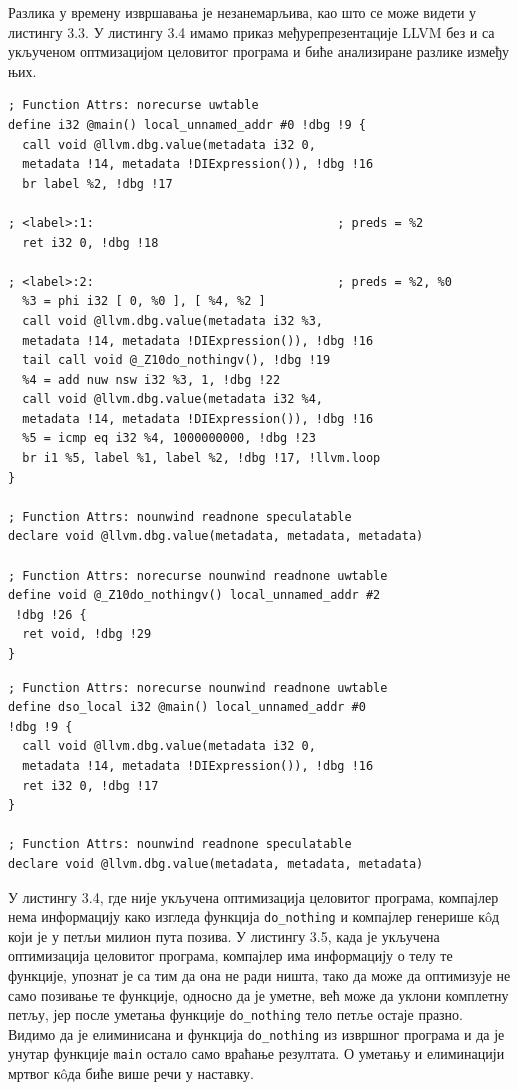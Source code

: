 \documentclass[12pt,oneside]{memoir}
\begin{document}
Разлика у времену извршавања је незанемарљива, као што се може видети у листингу 3.3.
У листингу 3.4 имамо приказ међурепрезентације LLVM  без и са укљученом оптмизацијом целовитог програма
и биће анализиране разлике између њих.
\begin{lstlisting}[frame=single, caption={Međureprezentacija bez optimizacije celovitog programa}, captionpos=b]
; Function Attrs: norecurse uwtable
define i32 @main() local_unnamed_addr #0 !dbg !9 {
  call void @llvm.dbg.value(metadata i32 0, 
  metadata !14, metadata !DIExpression()), !dbg !16
  br label %2, !dbg !17

; <label>:1:                                  ; preds = %2
  ret i32 0, !dbg !18

; <label>:2:                                  ; preds = %2, %0
  %3 = phi i32 [ 0, %0 ], [ %4, %2 ]
  call void @llvm.dbg.value(metadata i32 %3, 
  metadata !14, metadata !DIExpression()), !dbg !16
  tail call void @_Z10do_nothingv(), !dbg !19
  %4 = add nuw nsw i32 %3, 1, !dbg !22
  call void @llvm.dbg.value(metadata i32 %4,
  metadata !14, metadata !DIExpression()), !dbg !16
  %5 = icmp eq i32 %4, 1000000000, !dbg !23
  br i1 %5, label %1, label %2, !dbg !17, !llvm.loop
}

; Function Attrs: nounwind readnone speculatable
declare void @llvm.dbg.value(metadata, metadata, metadata)

; Function Attrs: norecurse nounwind readnone uwtable
define void @_Z10do_nothingv() local_unnamed_addr #2 
 !dbg !26 {
  ret void, !dbg !29
}
\end{lstlisting}


\begin{lstlisting}[frame=single, caption={Međureprezentacija sa optimizacijom celovitog programa}, captionpos=b]
; Function Attrs: norecurse nounwind readnone uwtable
define dso_local i32 @main() local_unnamed_addr #0 
!dbg !9 {
  call void @llvm.dbg.value(metadata i32 0, 
  metadata !14, metadata !DIExpression()), !dbg !16
  ret i32 0, !dbg !17
}

; Function Attrs: nounwind readnone speculatable
declare void @llvm.dbg.value(metadata, metadata, metadata)

\end{lstlisting}

У листингу 3.4, где није укључена оптимизација целовитог програма, компајлер нема информацију  како
изгледа функција \texttt{do{\_}nothing} и компајлер генерише к\^{o}д који је у петљи милион пута позива.
У листингу 3.5, када је укључена оптимизација целовитог програма, компајлер има информацију о телу те функције,
упознат је са тим да она не ради ништа, тако да може да оптимизује не само позивање те функције,
односно да је уметне, већ може да уклони комплетну петљу, јер после уметања
функције \texttt{do{\_}nothing} тело петље остаје празно.
Видимо да је елиминисана и функција \texttt{do{\_}nothing} из извршног програма и да је унутар
функције \texttt{main} остало само враћање резултата.
О уметању и елиминацији мртвог к\^{o}да биће више речи у наставку.
\end{document}
